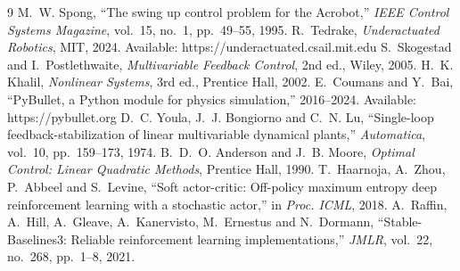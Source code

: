 \documentclass[12pt,a4paper]{article}
\begin{document}
\begin{thebibliography}{9}
 M.~W. Spong, ``The swing up control problem for the Acrobot,'' \emph{IEEE Control Systems Magazine}, vol.~15, no.~1, pp.~49--55, 1995.
 R.~Tedrake, \emph{Underactuated Robotics}, MIT, 2024. Available: https://underactuated.csail.mit.edu
 S.~Skogestad and I.~Postlethwaite, \emph{Multivariable Feedback Control}, 2nd ed., Wiley, 2005.
 H.~K. Khalil, \emph{Nonlinear Systems}, 3rd ed., Prentice Hall, 2002.
 E.~Coumans and Y.~Bai, ``PyBullet, a Python module for physics simulation,'' 2016--2024. Available: https://pybullet.org
 D.~C. Youla, J.~J. Bongiorno and C.~N. Lu, ``Single-loop feedback-stabilization of linear multivariable dynamical plants,'' \emph{Automatica}, vol.~10, pp.~159--173, 1974.
 B.~D.~O. Anderson and J.~B. Moore, \emph{Optimal Control: Linear Quadratic Methods}, Prentice Hall, 1990.
 T.~Haarnoja, A.~Zhou, P.~Abbeel and S.~Levine, ``Soft actor-critic: Off-policy maximum entropy deep reinforcement learning with a stochastic actor,'' in \emph{Proc. ICML}, 2018.
 A.~Raffin, A.~Hill, A.~Gleave, A.~Kanervisto, M.~Ernestus and N.~Dormann, ``Stable-Baselines3: Reliable reinforcement learning implementations,'' \emph{JMLR}, vol.~22, no.~268, pp.~1--8, 2021.
\end{thebibliography}
\end{document}
